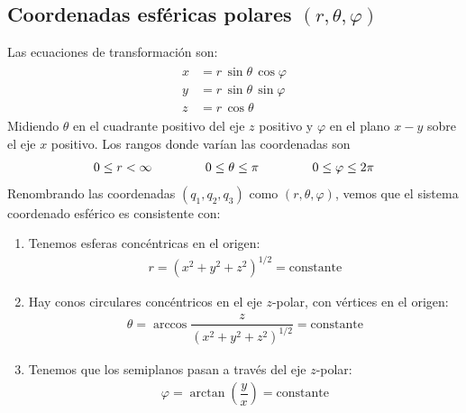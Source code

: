 \subsection{Coordenadas esféricas polares \texorpdfstring{$(r, \theta, \varphi)$}{(r, t, v)}}

Las ecuaciones de transformación son:
\begin{align}
\begin{aligned}
x &= r \, \sin \theta \, \cos \varphi \\
y &= r \, \sin \theta \, \sin \varphi \\
z &= r \, \cos \theta
\end{aligned}
\label{eq:ecuacion_02_038}
\end{align}
Midiendo $\theta$ en el cuadrante positivo del eje $z$ positivo y $\varphi$ en el plano $x-y$ sobre el eje $x$ positivo. Los rangos donde varían las coordenadas son
\begin{align*}
0 \leq r < \infty \hspace{1.5cm} 0 \leq \theta \leq \pi \hspace{1.5cm} 0 \leq \varphi \leq 2 \pi
\end{align*}
Renombrando las coordenadas $(q_{1}, q_{2}, q_{3})$ como $(r, \theta, \varphi)$, vemos que el sistema coordenado esférico es consistente con:
\begin{enumerate}
\item Tenemos esferas concéntricas en el origen:
\begin{align*}
r = (x^{2} + y^{2} + z^{2})^{1/2} =  \text{constante}
\end{align*}
\item Hay conos circulares concéntricos en el eje $z$-polar, con vértices en el origen:
\begin{align*}
\theta = \arccos \dfrac{z}{(x^{2} +y^{2} + z^{2})^{1/2}} = \text{constante}
\end{align*}
\item Tenemos que los semiplanos pasan a través del eje $z$-polar:
\begin{align*}
\varphi = \arctan\left(\dfrac{y}{x} \right) =  \text{constante}
\end{align*}
\end{enumerate}
